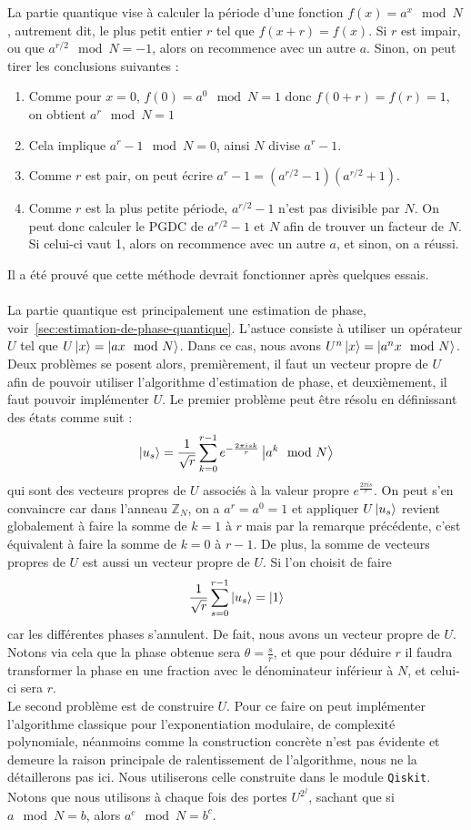 La partie quantique vise à calculer la période d'une fonction $f(x) = a^x \mod N$,
autrement dit, le plus petit entier $r$ tel que $f(x+r) = f(x)$.
Si $r$ est impair, ou que $a^{r/2} \mod N = -1$, alors on recommence avec un autre $a$.
Sinon, on peut tirer les conclusions suivantes :
\begin{enumerate}
    \item Comme pour $x=0$, $f(0) = a^0 \mod N = 1$ donc $f(0 + r)=f(r)=1$, on obtient $a^r \mod N = 1$
    \item Cela implique $a^r - 1 \mod N = 0$, ainsi $N$ divise $a^r - 1$.
    \item Comme $r$ est pair, on peut écrire $a^r - 1 = (a^{r/2} - 1)(a^{r/2} + 1)$.
    \item Comme $r$ est la plus petite période, $a^{r/2} - 1$ n'est pas divisible par $N$.
    On peut donc calculer le PGDC de $a^{r/2} - 1$ et $N$ afin de trouver un facteur de $N$.
    Si celui-ci vaut 1, alors on recommence avec un autre $a$, et sinon, on a réussi.
\end{enumerate}
Il a été prouvé que cette méthode devrait fonctionner après quelques essais.\\ \\
La partie quantique est principalement une estimation de phase, voir~\ref{sec:estimation-de-phase-quantique}.
L'astuce consiste à utiliser un opérateur $U$ tel que $U\ket{x} = \ket{ax \mod N}$.
Dans ce cas, nous avons $U^n\ket{x} = \ket{a^n x \mod N}$.\\
Deux problèmes se posent alors, premièrement, il faut un vecteur propre de $U$ afin de pouvoir
utiliser l'algorithme d'estimation de phase, et deuxièmement, il faut pouvoir implémenter $U$.
Le premier problème peut être résolu en définissant des états comme suit :
\[
    \ket{u_s} = \frac{1}{\sqrt{r}} \sum_{k=0}^{r-1} e^{-\frac{2 \pi i s k}{r}} \ket{a^k \mod N}
\]
qui sont des vecteurs propres de $U$ associés à la valeur propre $e^{\frac{2 \pi i s}{r}}$.
On peut s'en convaincre car dans l'anneau $\mathbb{Z}_N$, on a $a^r = a^0 = 1$ et appliquer
$U \ket{u_s}$ revient globalement à faire la somme de $k=1$ à $r$ mais par la remarque précédente,
c'est équivalent à faire la somme de $k=0$ à $r-1$.
De plus, la somme de vecteurs propres de $U$ est aussi un vecteur propre de $U$.
Si l'on choisit de faire
\[
    \frac{1}{\sqrt{r}} \sum_{s=0}^{r-1} \ket{u_s} = \ket{1}
\]
car les différentes phases s'annulent.
De fait, nous avons un vecteur propre de $U$.\\
Notons via cela que la phase obtenue sera $\theta = \frac{s}{r}$, et que pour déduire $r$ il faudra
transformer la phase en une fraction avec le dénominateur inférieur à $N$, et celui-ci sera $r$.\\
Le second problème est de construire $U$.
Pour ce faire on peut implémenter l'algorithme classique pour l'exponentiation modulaire,
de complexité polynomiale, néanmoins comme la construction concrète n'est pas évidente et
demeure la raison principale de ralentissement de l'algorithme, nous ne la détaillerons pas ici.
Nous utiliserons celle construite dans le module \texttt{Qiskit}.
Notons que nous utilisons à chaque fois des portes $U^{2^j}$, sachant que si $a \mod N = b$, alors
$a^c \mod N = b^c$.

